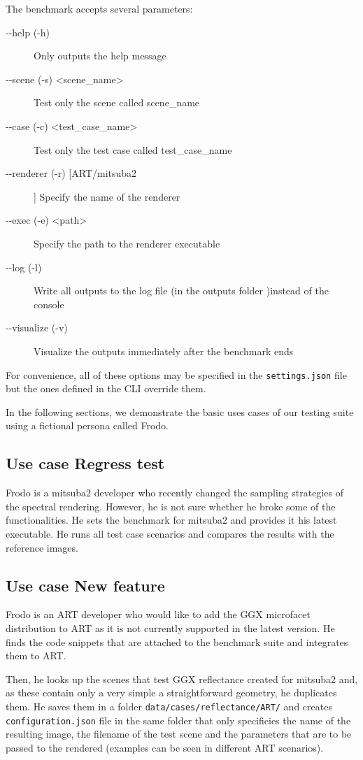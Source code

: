 The benchmark accepts several parameters:
\begin{description}
	\item[-{}-help (-h)] Only outputs the help message
	\item[-{}-scene (-s) \textless scene\_name\textgreater] Test only the scene called scene\_name
	\item[-{}-case (-c) \textless test\_case\_name\textgreater] Test only the test case called test\_case\_name
	\item[-{}-renderer (-r) [ART/mitsuba2]] Specify the name of the renderer 
	\item[-{}-exec (-e) \textless path\textgreater] Specify the path to the renderer executable
	\item[-{}-log (-l)] Write all outputs to the log file (in the outputs folder )instead of the console
	\item[-{}-visualize (-v)] Visualize the outputs immediately after the benchmark ends
\end{description}

For convenience, all of these options may be specified in the \texttt{settings.json} file but the ones defined in the CLI override them.

In the following sections, we demonstrate the basic uses cases of our testing suite using a fictional persona called Frodo.

\subsection{Use case Regress test}

Frodo is a mitsuba2 developer who recently changed the sampling strategies of the spectral rendering. However, he is not sure whether he broke some of the functionalities. He sets the benchmark for mitsuba2 and provides it his latest executable. He runs all test case scenarios and compares the results with the reference images.
 
\subsection{Use case New feature}
\label{sec:frodo}
Frodo is an ART developer who would like to add the GGX microfacet distribution to ART as it is not currently supported in the latest version. He finds the code snippets that are attached to the benchmark suite and integrates them to ART.

Then, he looks up the scenes that test GGX reflectance created for mitsuba2 and, as these contain only a very simple a straightforward geometry, he duplicates them. He saves them in a folder \texttt{data/cases/reflectance/ART/} and creates \texttt{configuration.json} file in the same folder that only specificies the name of the resulting image, the filename of the test scene and the parameters that are to be passed to the rendered (examples can be seen in different ART scenarios).

